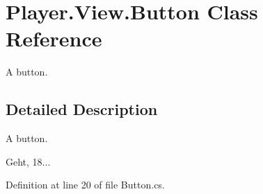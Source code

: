 \section{Player.\-View.\-Button Class Reference}
\label{class_player_1_1_view_1_1_button}


A button.  




\subsection{Detailed Description}
A button. 

Geht, 18... 

Definition at line 20 of file Button.\-cs.

